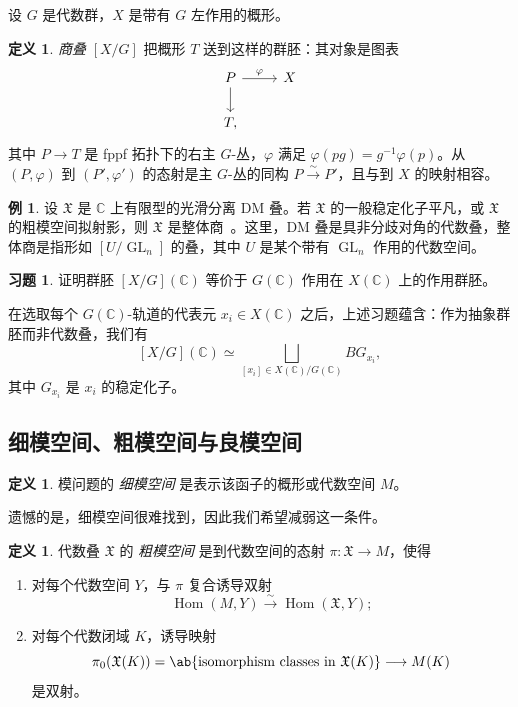 \documentclass{amsart}
\theoremstyle{definition}
\newtheorem{defn}[thm]{定义}
\newtheorem{exm}[thm]{例}
\newtheorem{exer}[thm]{习题}
\theoremstyle{remark}
\theoremstyle{plain}
\theoremstyle{definition}
\theoremstyle{remark}
\newcommand{\C}{\mathbb{C}}
\newcommand{\mf}[1]{\mathfrak{#1}}
\newcommand{\on}[1]{\operatorname{#1}}
\newcommand{\1}{\mathbf{1}}
\newcommand{\2}{\mathbf{2}}
\newcommand{\3}{\mathbf{3}}
\begin{document}
设 \(G\) 是代数群，\(X\) 是带有 \(G\) 左作用的概形。

\begin{defn}
    \textit{商叠} \([X/G]\) 把概形 \(T\) 送到这样的群胚：其对象是图表
    \begin{equation*}
    \begin{tikzcd}
        P \ar{r}{\varphi} \ar{d} & X \\
        T,
    \end{tikzcd}
    \end{equation*}
    其中 \(P\to T\) 是 fppf 拓扑下的右主 \(G\)-丛，\(\varphi\) 满足 \(\varphi(pg)=g^{-1}\varphi(p)\)。从 \((P,\varphi)\) 到 \((P',\varphi')\) 的态射是主 \(G\)-丛的同构 \(P\xrightarrow{\sim}P'\)，且与到 \(X\) 的映射相容。
\end{defn}

\begin{exm}
    设 \(\mf{X}\) 是 \(\C\) 上有限型的光滑分离 DM 叠。若 \(\mf{X}\) 的一般稳定化子平凡，或 \(\mf{X}\) 的粗模空间拟射影，则 \(\mf{X}\) 是整体商~\cite{EHKV2001}。这里，DM 叠是具非分歧对角的代数叠，整体商是指形如 \([U/\on{GL}_n]\) 的叠，其中 \(U\) 是某个带有 \(\on{GL}_n\) 作用的代数空间。
\end{exm}

\begin{exer}
    证明群胚 \([X/G](\C)\) 等价于 \(G(\C)\) 作用在 \(X(\C)\) 上的作用群胚。
\end{exer}

在选取每个 \(G(\C)\)-轨道的代表元 \(x_i\in X(\C)\) 之后，上述习题蕴含：作为抽象群胚而非代数叠，我们有
\[ 
    [X/G](\C) \simeq \bigsqcup_{[x_i] \in X(\C)/G(\C)} BG_{x_i}, 
\]
其中 \(G_{x_i}\) 是 \(x_i\) 的稳定化子。


\subsection{细模空间、粗模空间与良模空间}%
\label{sub:Fine vs coarse vs good moduli spaces}

\begin{defn}
    模问题的 \textit{细模空间} 是表示该函子的概形或代数空间 \(M\)。
\end{defn}

遗憾的是，细模空间很难找到，因此我们希望减弱这一条件。

\begin{defn}
    代数叠 \(\mf{X}\) 的 \textit{粗模空间} 是到代数空间的态射 \(\pi\colon\mf{X}\to M\)，使得
    \begin{enumerate}
        \item 对每个代数空间 \(Y\)，与 \(\pi\) 复合诱导双射
        \[
            \on{Hom}(M,Y)\xrightarrow{\sim}\on{Hom}(\mf{X},Y);
        \]
        \item 对每个代数闭域 \(K\)，诱导映射
        \[
            \pi_0(\mf{X}(K))=\ab\{\text{isomorphism classes in }\mf{X}(K)\}
            \longrightarrow M(K)
        \]
        是双射。
    \end{enumerate}
\end{defn}
\end{document}
